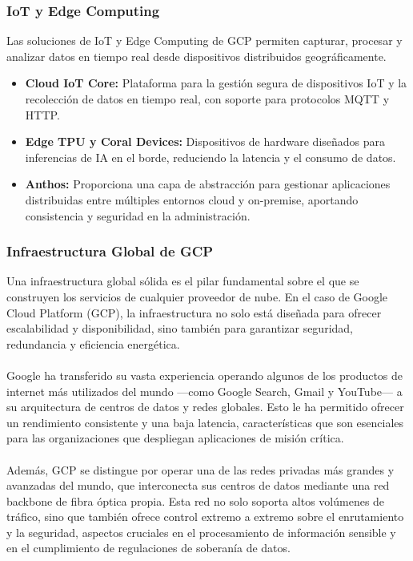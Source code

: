 {            \subsubsection{IoT y Edge Computing}
                Las soluciones de IoT y Edge Computing de GCP permiten capturar, procesar y analizar datos en tiempo real desde dispositivos distribuidos geográficamente.
                
                \begin{itemize}
                    \item \textbf{Cloud IoT Core:} Plataforma para la gestión segura de dispositivos IoT y la recolección de datos en tiempo real, con soporte para protocolos MQTT y HTTP.
                    \item \textbf{Edge TPU y Coral Devices:} Dispositivos de hardware diseñados para inferencias de IA en el borde, reduciendo la latencia y el consumo de datos.
                    \item \textbf{Anthos:} Proporciona una capa de abstracción para gestionar aplicaciones distribuidas entre múltiples entornos cloud y on-premise, aportando consistencia y seguridad en la administración.
                \end{itemize}

            \subsubsection{Infraestructura Global de GCP}
                Una infraestructura global sólida es el pilar fundamental sobre el que se construyen los servicios de cualquier proveedor de nube. En el caso de Google Cloud Platform (GCP), la infraestructura no solo está diseñada para ofrecer escalabilidad y disponibilidad, sino también para garantizar seguridad, redundancia y eficiencia energética.
                
                \paragraph{}Google ha transferido su vasta experiencia operando algunos de los productos de internet más utilizados del mundo —como Google Search, Gmail y YouTube— a su arquitectura de centros de datos y redes globales. Esto le ha permitido ofrecer un rendimiento consistente y una baja latencia, características que son esenciales para las organizaciones que despliegan aplicaciones de misión crítica.
                
                \paragraph{}Además, GCP se distingue por operar una de las redes privadas más grandes y avanzadas del mundo, que interconecta sus centros de datos mediante una red backbone de fibra óptica propia. Esta red no solo soporta altos volúmenes de tráfico, sino que también ofrece control extremo a extremo sobre el enrutamiento y la seguridad, aspectos cruciales en el procesamiento de información sensible y en el cumplimiento de regulaciones de soberanía de datos.
                
}
